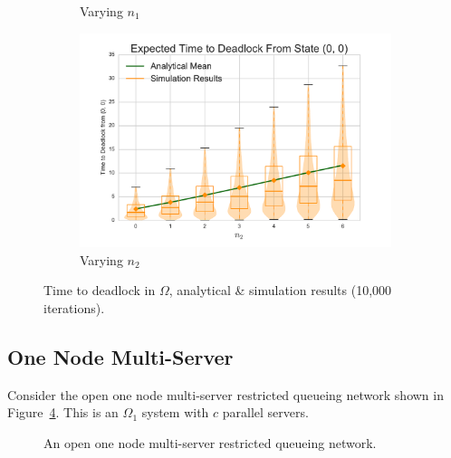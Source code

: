 \documentclass{article}
\begin{document}
\begin{figure}[!htbp]
\begin{center}
\begin{subfigure}[b]{0.35\textwidth}
  \caption{Varying $n_1$}
  \label{fig:timestodeadlockfb_n1}
\end{subfigure}
\begin{subfigure}[b]{0.35\textwidth}
  \includegraphics[width=\textwidth]{images/vary_n2fb}
  \caption{Varying $n_2$}
  \label{fig:timestodeadlockfb_n2}
\end{subfigure}
\end{center}
\caption{Time to deadlock in $\Omega$, analytical \& simulation results (10,000 iterations).}
\label{fig:timestodeadlockfeedback}
\end{figure}











\subsection{One Node Multi-Server}\label{sec:1nodeMS}

Consider the open one node multi-server restricted queueing network shown in Figure~\ref{fig:queueingnetwork_1nodemulti}.
This is an $\Omega_1$ system with $c$ parallel servers.

\begin{figure}[!htbp]
  \begin{center}
  
  \end{center}
  \caption{An open one node multi-server restricted queueing network.}
  \label{fig:queueingnetwork_1nodemulti}
\end{figure}
\end{document}
